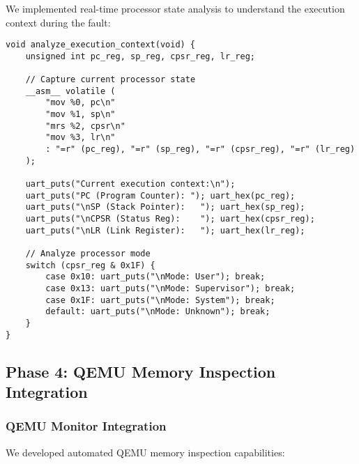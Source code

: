 \documentclass[11pt,a4paper]{article}
\begin{document}
We implemented real-time processor state analysis to understand the execution context during the fault:

\begin{lstlisting}[caption={Execution Context Analysis Implementation}]
void analyze_execution_context(void) {
    unsigned int pc_reg, sp_reg, cpsr_reg, lr_reg;
    
    // Capture current processor state
    __asm__ volatile (
        "mov %0, pc\n"
        "mov %1, sp\n"
        "mrs %2, cpsr\n"
        "mov %3, lr\n"
        : "=r" (pc_reg), "=r" (sp_reg), "=r" (cpsr_reg), "=r" (lr_reg)
    );
    
    uart_puts("Current execution context:\n");
    uart_puts("PC (Program Counter): "); uart_hex(pc_reg);
    uart_puts("\nSP (Stack Pointer):   "); uart_hex(sp_reg);
    uart_puts("\nCPSR (Status Reg):    "); uart_hex(cpsr_reg);
    uart_puts("\nLR (Link Register):   "); uart_hex(lr_reg);
    
    // Analyze processor mode
    switch (cpsr_reg & 0x1F) {
        case 0x10: uart_puts("\nMode: User"); break;
        case 0x13: uart_puts("\nMode: Supervisor"); break;
        case 0x1F: uart_puts("\nMode: System"); break;
        default: uart_puts("\nMode: Unknown"); break;
    }
}
\end{lstlisting}

\subsection{Phase 4: QEMU Memory Inspection Integration}

\subsubsection{QEMU Monitor Integration}

We developed automated QEMU memory inspection capabilities:
\end{document}
